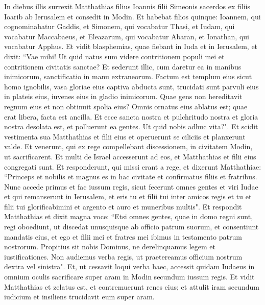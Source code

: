 \begin{biblechapter}  
\verse In diebus illis surrexit Matthathias filius Ioannis filii Simeonis sacerdos ex filiis Ioarib ab Ierusalem et consedit in Modin. 
\verse Et habebat filios quinque: Ioannem, qui cognominabatur Gaddis, 
\verse et Simonem, qui vocabatur Thasi, 
\verse et Iudam, qui vocabatur Maccabaeus, 
\verse et Eleazarum, qui vocabatur Abaran, et Ionathan, qui vocabatur Apphus. 
\verse Et vidit blasphemias, quae fiebant in Iuda et in Ierusalem, 
\verse et dixit: “Vae mihi! Ut quid natus sum videre contritionem populi mei et contritionem civitatis sanctae? Et sederunt illic, cum daretur ea in manibus inimicorum, sanctificatio in manu extraneorum. 
\verse Factum est templum eius sicut homo ignobilis, 
\verse vasa gloriae eius captiva abducta sunt, trucidati sunt parvuli eius in plateis eius, iuvenes eius in gladio inimicorum. 
\verse Quae gens non hereditavit regnum eius et non obtinuit spolia eius? 
\verse Omnis ornatus eius ablatus est; quae erat libera, facta est ancilla. 
\verse Et ecce sancta nostra et pulchritudo nostra et gloria nostra desolata est, et polluerunt ea gentes.  
\verse Ut quid nobis adhuc vita?". 
\verse Et scidit vestimenta sua Matthathias et filii eius et operuerunt se ciliciis et planxerunt valde. 
\verse Et venerunt, qui ex rege compellebant discessionem, in civitatem Modin, ut sacrificarent. 
\verse Et multi de Israel accesserunt ad eos, et Matthathias et filii eius congregati sunt. 
\verse Et responderunt, qui missi erant a rege, et dixerunt Matthathiae: “Princeps et nobilis et magnus es in hac civitate et confirmatus filiis et fratribus. 
\verse Nunc accede primus et fac iussum regis, sicut fecerunt omnes gentes et viri Iudae et qui remanserunt in Ierusalem, et eris tu et filii tui inter amicos regis et tu et filii tui glorificabimini et argento et auro et muneribus multis". 
\verse Et respondit Matthathias et dixit magna voce: “Etsi omnes gentes, quae in domo regni sunt, regi oboediunt, ut discedat unusquisque ab officio patrum suorum, et consentiunt mandatis eius,  
\verse et ego et filii mei et fratres mei ibimus in testamento patrum nostrorum.  
\verse Propitius sit nobis Dominus, ne derelinquamus legem et iustificationes.  
\verse Non audiemus verba regis, ut praetereamus officium nostrum dextra vel sinistra". 
\verse Et, ut cessavit loqui verba haec, accessit quidam Iudaeus in omnium oculis sacrificare super aram in Modin secundum iussum regis. 
\verse Et vidit Matthathias et zelatus est, et contremuerunt renes eius; et attulit iram secundum iudicium et insiliens trucidavit eum super aram. 

\end{biblechapter}
